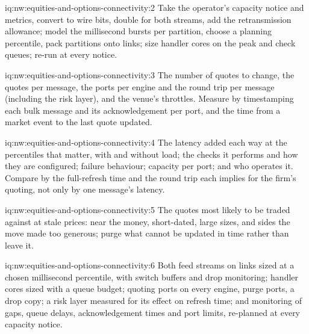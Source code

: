 \begin{solution}{iq:nw:equities-and-options-connectivity:2}
Take the operator's capacity notice and metrics, convert to wire bits, double for both streams, add the retransmission allowance;
model the millisecond bursts per partition, choose a planning percentile, pack partitions onto links; size handler cores on the peak
and check queues; re-run at every notice.
\end{solution}

\begin{solution}{iq:nw:equities-and-options-connectivity:3}
The number of quotes to change, the quotes per message, the ports per engine and the round trip per message (including the risk layer),
and the venue's throttles. Measure by timestamping each bulk message and its acknowledgement per port, and the time from a market event
to the last quote updated.
\end{solution}

\begin{solution}{iq:nw:equities-and-options-connectivity:4}
The latency added each way at the percentiles that matter, with and without load; the checks it performs and how they are configured;
failure behaviour; capacity per port; and who operates it. Compare by the full-refresh time and the round trip each implies for the
firm's quoting, not only by one message's latency.
\end{solution}

\begin{solution}{iq:nw:equities-and-options-connectivity:5}
The quotes most likely to be traded against at stale prices: near the money, short-dated, large sizes, and sides the move made too
generous; purge what cannot be updated in time rather than leave it.
\end{solution}

\begin{solution}{iq:nw:equities-and-options-connectivity:6}
Both feed streams on links sized at a chosen millisecond percentile, with switch buffers and drop monitoring; handler cores sized with a
queue budget; quoting ports on every engine, purge ports, a drop copy; a risk layer measured for its effect on refresh time; and
monitoring of gaps, queue delays, acknowledgement times and port limits, re-planned at every capacity notice.
\end{solution}
